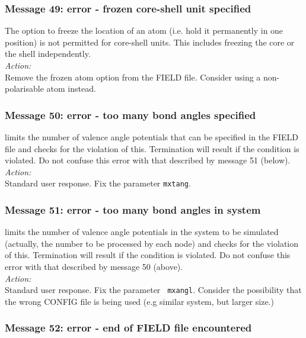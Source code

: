 \subsubsection*{Message 49: error - frozen core-shell unit specified}

The \D{} option to freeze the location of an atom (i.e. hold
it permanently in one position) is not permitted for core-shell units.
This includes freezing the core or the shell independently. \\

\noindent
{\em Action:} \\
Remove the frozen atom option from the FIELD file. Consider using a
non-polarisable atom instead. 

\subsubsection*{Message 50: error - too many bond angles specified}

\D{} limits the number of valence angle
potentials  that can be
specified in the FIELD file and checks for the violation of this.
Termination will result if the condition is violated.
Do not confuse
this error with that described by message 51 (below). \\ 

\noindent
{\em Action:} \\ 
Standard user response. Fix the parameter {\tt mxtang}.

\subsubsection*{Message 51: error - too many bond angles in system}

\D{} limits the number of valence angle  potentials in the system
to be simulated (actually, the number to be processed by each node)
and checks for the violation of this.  Termination will result if the
condition is violated. Do not confuse
this error with that described by message 50 (above). \\ 

\noindent
{\em Action:} \\ Standard user response. Fix the parameter {\tt
mxangl}.  Consider the possibility that the wrong CONFIG file is being
used (e.g similar system, but larger size.)

\subsubsection*{Message 52: error - end of FIELD file encountered}

